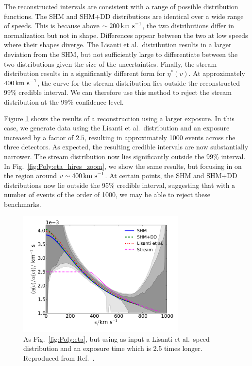 The reconstructed intervals are consistent with a range of possible distribution functions. The SHM and SHM+DD distributions are identical over a wide range of speeds. This is because above $\sim 200 \,\textrm{km s}^{-1}$, the two distributions differ in normalization but not in shape. Differences appear between the two at low speeds where their shapes diverge. The Lisanti et al.\ distribution results in a larger deviation from the SHM, but not sufficiently large to differentiate between the two distributions given the size of the uncertainties. Finally, the stream distribution results in a significantly different form for $\eta^*(v)$. At approximately $400 \,\textrm{km s}^{-1}$, the curve for the stream distribution lies outside the reconstructed 99\% credible interval. We can therefore use this method to reject the stream distribution at the 99\% confidence level.

Figure \ref{fig:Poly:eta_hires} shows the results of a reconstruction using a larger exposure. In this case, we generate data using the Lisanti et al.\ distribution and an exposure increased by a factor of $2.5$, resulting in approximately 1000 events across the three detectors. As expected, the resulting credible intervals are now substantially narrower. The stream distribution now lies significantly outside the 99\% interval. In Fig.~\ref{fig:Poly:eta_hires_zoom}, we show the same results, but focusing in on the region around $v \sim 400 \,\textrm{km s}^{-1}$. At certain points, the SHM and SHM+DD distributions now lie outside the 95\% credible interval, suggesting that with a number of events of the order of 1000, we may be able to reject these benchmarks.

\begin{figure}[t]
\centering
  \includegraphics[width=0.75\textwidth]{Poly/LIS_hires.pdf}
  \caption{As Fig.~\ref{fig:Poly:eta}, but using as input a Lisanti et al.\ speed distribution and an exposure time which is 2.5 times longer. Reproduced from Ref.~\cite{Kavanagh:2014}.}
  \label{fig:Poly:eta_hires}
\end{figure}



